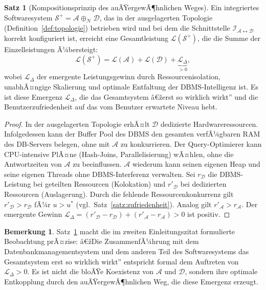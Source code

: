 ﻿\documentclass[a4paper,12pt]{article}
\theoremstyle{definition}
\newtheorem{satz}{Satz}
\newtheorem{bemerkung}{Bemerkung}
\begin{document}
\begin{satz}[Kompositionsprinzip des auÃŸergewÃ¶hnlichen Weges]
\label{satz:komposition}
Ein integriertes Softwaresystem $\mathcal{S}^+ = \mathcal{A} \oplus_{\mathcal{N}} \mathcal{D}$, das in der ausgelagerten Topologie (Definition~\ref{def:topologie}) betrieben wird und bei dem die Schnittstelle $\mathcal{I}_{\mathcal{A} \leftrightarrow \mathcal{D}}$ korrekt konfiguriert ist, erreicht eine Gesamtleistung $\mathcal{L}(\mathcal{S}^+)$, die die Summe der Einzelleistungen Ã¼bersteigt:
\[
\mathcal{L}(\mathcal{S}^+) = \mathcal{L}(\mathcal{A}) + \mathcal{L}(\mathcal{D}) + \underbrace{\mathcal{L}_\Delta}_{> 0},
\]
wobei $\mathcal{L}_\Delta$ der emergente Leistungsgewinn durch Ressourcenisolation, unabhÃ¤ngige Skalierung und optimale Entfaltung der DBMS-Intelligenz ist. Es ist diese Emergenz $\mathcal{L}_\Delta$, die das Gesamtsystem â€žerst so wirklich wirkt'' und die Benutzerzufriedenheit auf das vom Benutzer erwartete Niveau hebt.
\end{satz}

\begin{proof}
In der ausgelagerten Topologie erhÃ¤lt $\mathcal{D}$ dedizierte Hardwareressourcen. Infolgedessen kann der Buffer Pool des DBMS den gesamten verfÃ¼gbaren RAM des DB-Servers belegen, ohne mit $\mathcal{A}$ zu konkurrieren. Der Query-Optimierer kann CPU-intensive PlÃ¤ne (Hash-Joins, Parallelisierung) wÃ¤hlen, ohne die Antwortzeiten von $\mathcal{A}$ zu beeinflussen. $\mathcal{A}$ wiederum kann seinen eigenen Heap und seine eigenen Threads ohne DBMS-Interferenz verwalten. Sei $r_\mathcal{D}$ die DBMS-Leistung bei geteilten Ressourcen (Kolokation) und $r'_\mathcal{D}$ bei dedizierten Ressourcen (Auslagerung). Durch die fehlende Ressourcenkonkurrenz gilt $r'_\mathcal{D} > r_\mathcal{D}$ fÃ¼r $u > u^*$ (vgl.\ Satz~\ref{satz:zufriedenheit}). Analog gilt $r'_\mathcal{A} > r_\mathcal{A}$. Der emergente Gewinn $\mathcal{L}_\Delta = (r'_\mathcal{D} - r_\mathcal{D}) + (r'_\mathcal{A} - r_\mathcal{A}) > 0$ ist positiv.
\end{proof}

\begin{bemerkung}
Satz~\ref{satz:komposition} macht die im zweiten Einleitungszitat formulierte Beobachtung prÃ¤zise: â€žDie ZusammenfÃ¼hrung mit dem Datenbankmanagementsystem und dem anderen Teil des Softwaresystems das Gesamtsystem erst so wirklich wirkt'' entspricht formal dem Auftreten von $\mathcal{L}_\Delta > 0$. Es ist nicht die bloÃŸe Koexistenz von $\mathcal{A}$ und $\mathcal{D}$, sondern ihre optimale Entkopplung durch den auÃŸergewÃ¶hnlichen Weg, die diese Emergenz erzeugt.
\end{bemerkung}
\end{document}
